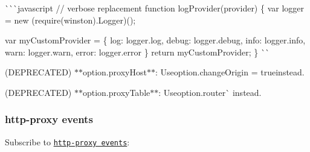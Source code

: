\begin{DoxyItemize}
\`{}\`{}\`{}javascript // verbose replacement function log\+Provider(provider) \{ var logger = new (require(\textquotesingle{}winston\textquotesingle{}).Logger)();

var my\+Custom\+Provider = \{ log\+: logger.\+log, debug\+: logger.\+debug, info\+: logger.\+info, warn\+: logger.\+warn, error\+: logger.\+error \} return my\+Custom\+Provider; \} \`{}\`{}{\ttfamily }
\item {\ttfamily (D\+E\+P\+R\+E\+C\+A\+T\+ED) $\ast$$\ast$option.proxy\+Host$\ast$$\ast$\+: Use}option.\+change\+Origin = true{\ttfamily instead.}
\item {\ttfamily (D\+E\+P\+R\+E\+C\+A\+T\+ED) $\ast$$\ast$option.proxy\+Table$\ast$$\ast$\+: Use}option.\+router\`{} instead.
\end{DoxyItemize}

\subsubsection*{http-\/proxy events}

Subscribe to \href{https://github.com/nodejitsu/node-http-proxy#listening-for-proxy-events}{\tt http-\/proxy events}\+:


